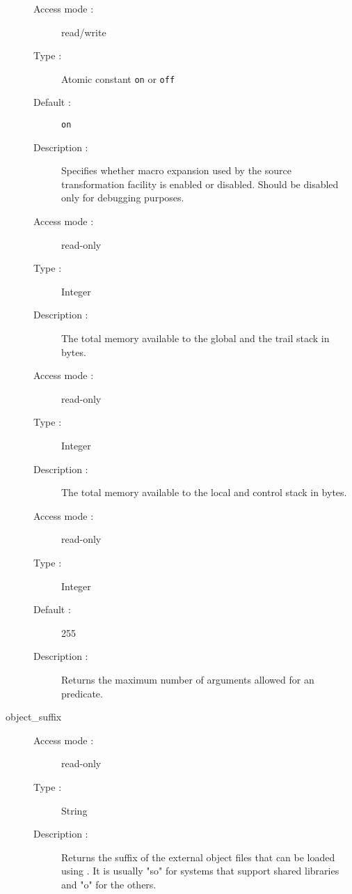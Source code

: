 \begin{description}
\begin{description}
\item[Access mode : ] read/write 
\item[Type : ] Atomic constant {\tt on} or {\tt off} 
\item[Default : ] {\tt on}
\item[Description : ] Specifies whether macro expansion used by the source
transformation facility is enabled or disabled.
Should be disabled only for debugging purposes.
\end{description}

\begin{description}
\item[Access mode :] read-only
\item[Type :] Integer
\item[Description :] The total memory available to the global and the trail
stack in bytes.
\end{description}

\begin{description}
\item[Access mode :] read-only
\item[Type :] Integer
\item[Description :] The total memory available to the local and control stack
in bytes.
\end{description}

\begin{description}
\item[Access mode : ] read-only 
\item[Type : ] Integer 
\item[Default : ] 255
\item[Description : ] Returns the maximum number of arguments allowed for 
an {\eclipse} predicate.
\end{description}

\item[object_suffix]
\begin{description}
\item[Access mode : ] read-only
\item[Type : ] String
\item[Description : ] Returns the suffix of the external
object files that can be loaded using .
It is usually "so" for systems that support shared libraries
and "o" for the others.
\end{description}
 

\end{description}
